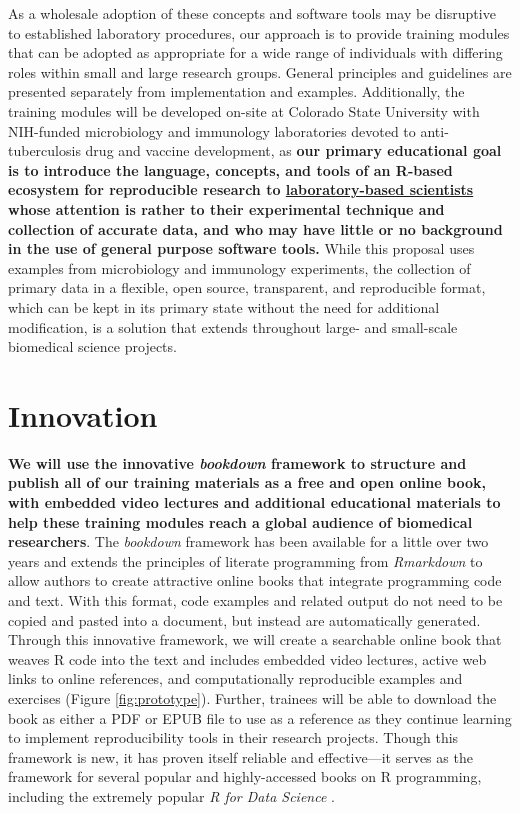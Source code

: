 \documentclass[pdftex,english,11.5pt,parskip=half]{scrartcl}
\begin{document}
As a wholesale adoption of these concepts and software tools may be disruptive to established 
laboratory procedures, our 
approach is to provide training modules that can be adopted as appropriate 
for a wide range of individuals with differing roles within small and large research groups.  
General principles and guidelines are presented separately from implementation and examples. 
Additionally, the training modules will be developed on-site at Colorado State University with NIH-funded microbiology
and immunology laboratories devoted to anti-tuberculosis drug and vaccine development, as
\textbf{our primary educational goal is to introduce the language, concepts, and tools of an R-based 
ecosystem for reproducible research to \underline{laboratory-based scientists} whose attention is rather to 
their experimental technique and collection of accurate data, and who may have little or no background 
in the use of general purpose software tools.} While this proposal uses examples from microbiology 
and immunology experiments, the collection of primary data in a flexible, open source, 
transparent, and reproducible format, which can be kept in its primary state 
without the need for additional modification, is a solution that extends throughout large- and 
small-scale biomedical science projects. 

\section{Innovation} \vspace{-0.1in}

\textbf{We will use the
innovative \textit{bookdown} framework \cite{xie2016bookdown} to structure and
publish all of our training materials as a free and open online book, with embedded video lectures and additional educational materials to help these training modules reach a global audience of biomedical researchers}. The
\textit{bookdown} framework has been available for a little over two years and
extends the principles of literate programming from \textit{Rmarkdown} \cite{xie2015dynamic} to allow authors to create attractive
online books that integrate programming code and text. With this format, code examples and related
output do not need to be copied and pasted into a document, but instead are
automatically generated. Through this innovative framework, we
will create a searchable online book that weaves R code into the text
and includes embedded video lectures, active web links to online
references, and computationally reproducible examples and exercises
(Figure \ref*{fig:prototype}). Further, trainees will be able to
download the book as either a PDF or EPUB file to use as a reference as they
continue learning to implement reproducibility tools in their research projects. Though this framework is new, it has proven
itself reliable and effective---it serves as the framework for several 
popular and highly-accessed books on R programming, including the extremely popular  \textit{R for Data
Science} \cite{wickham2016r}. 
\end{document}
